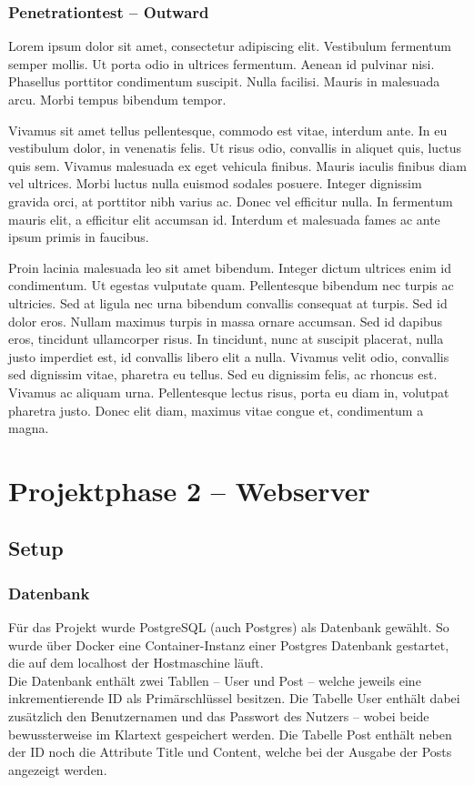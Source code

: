 \subsection{Penetrationtest – Outward}

Lorem ipsum dolor sit amet, consectetur adipiscing elit. Vestibulum fermentum semper mollis. Ut porta odio in ultrices fermentum. Aenean id pulvinar nisi. Phasellus porttitor condimentum suscipit. Nulla facilisi. Mauris in malesuada arcu. Morbi tempus bibendum tempor.

Vivamus sit amet tellus pellentesque, commodo est vitae, interdum ante. In eu vestibulum dolor, in venenatis felis. Ut risus odio, convallis in aliquet quis, luctus quis sem. Vivamus malesuada ex eget vehicula finibus. Mauris iaculis finibus diam vel ultrices. Morbi luctus nulla euismod sodales posuere. Integer dignissim gravida orci, at porttitor nibh varius ac. Donec vel efficitur nulla. In fermentum mauris elit, a efficitur elit accumsan id. Interdum et malesuada fames ac ante ipsum primis in faucibus.

Proin lacinia malesuada leo sit amet bibendum. Integer dictum ultrices enim id condimentum. Ut egestas vulputate quam. Pellentesque bibendum nec turpis ac ultricies. Sed at ligula nec urna bibendum convallis consequat at turpis. Sed id dolor eros. Nullam maximus turpis in massa ornare accumsan. Sed id dapibus eros, tincidunt ullamcorper risus. In tincidunt, nunc at suscipit placerat, nulla justo imperdiet est, id convallis libero elit a nulla. Vivamus velit odio, convallis sed dignissim vitae, pharetra eu tellus. Sed eu dignissim felis, ac rhoncus est. Vivamus ac aliquam urna. Pellentesque lectus risus, porta eu diam in, volutpat pharetra justo. Donec elit diam, maximus vitae congue et, condimentum a magna.

\chapter{Projektphase 2 – Webserver}
\section{Setup}
\subsection{Datenbank}
Für das Projekt wurde PostgreSQL (auch Postgres) als Datenbank gewählt. So wurde über Docker eine Container-Instanz einer Postgres Datenbank gestartet, die auf dem localhost der Hostmaschine läuft. \\
Die Datenbank enthält zwei Tabllen – User und Post – welche jeweils eine inkrementierende ID als Primärschlüssel besitzen. 
Die Tabelle User enthält dabei zusätzlich den Benutzernamen und das Passwort des Nutzers – wobei beide bewussterweise im Klartext gespeichert werden. 
Die Tabelle Post enthält neben der ID noch die Attribute Title und Content, welche bei der Ausgabe der Posts angezeigt werden. 
